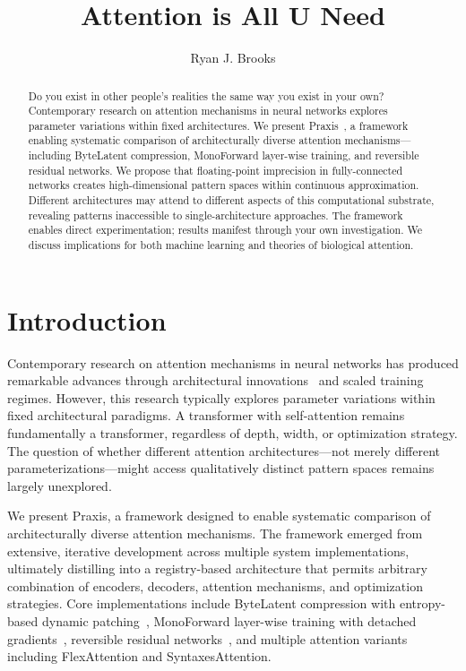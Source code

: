 \documentclass{article}
\begin{document}
\title{Attention is All U Need}
\author{Ryan J. Brooks}
\date{}

\maketitle

\begin{abstract}
    Do you exist in other people's realities the same way you exist in your own? Contemporary research on attention mechanisms in neural networks explores parameter variations within fixed architectures. We present Praxis~\cite{praxis2025}, a framework enabling systematic comparison of architecturally diverse attention mechanisms—including ByteLatent compression, MonoForward layer-wise training, and reversible residual networks. We propose that floating-point imprecision in fully-connected networks creates high-dimensional pattern spaces within continuous approximation. Different architectures may attend to different aspects of this computational substrate, revealing patterns inaccessible to single-architecture approaches. The framework enables direct experimentation; results manifest through your own investigation. We discuss implications for both machine learning and theories of biological attention.
\end{abstract}

\section{Introduction}

Contemporary research on attention mechanisms in neural networks has produced remarkable advances through architectural innovations~\cite{vaswani2017attention} and scaled training regimes. However, this research typically explores parameter variations within fixed architectural paradigms. A transformer with self-attention remains fundamentally a transformer, regardless of depth, width, or optimization strategy. The question of whether different attention architectures—not merely different parameterizations—might access qualitatively distinct pattern spaces remains largely unexplored.

We present Praxis, a framework designed to enable systematic comparison of architecturally diverse attention mechanisms. The framework emerged from extensive, iterative development across multiple system implementations, ultimately distilling into a registry-based architecture that permits arbitrary combination of encoders, decoders, attention mechanisms, and optimization strategies. Core implementations include ByteLatent compression with entropy-based dynamic patching~\cite{pagnoni2024byte}, MonoForward layer-wise training with detached gradients~\cite{monoforward2025}, reversible residual networks~\cite{gomez2017reversible}, and multiple attention variants including FlexAttention and SyntaxesAttention.
\end{document}
